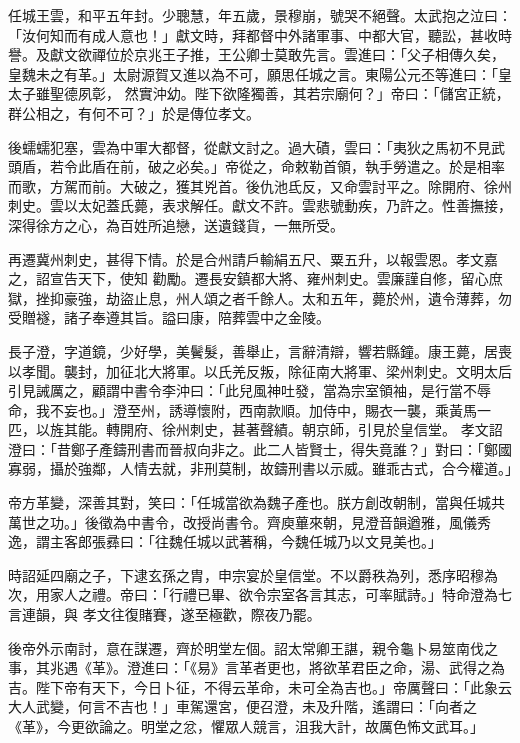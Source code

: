 
\begin{pinyinscope}

 任城王雲，和平五年封。少聰慧，年五歲，景穆崩，號哭不絕聲。太武抱之泣曰：「汝何知而有成人意也！」獻文時，拜都督中外諸軍事、中都大官，聽訟，甚收時譽。及獻文欲禪位於京兆王子推，王公卿士莫敢先言。雲進曰：「父子相傳久矣，皇魏未之有革。」太尉源賀又進以為不可，願思任城之言。東陽公元丕等進曰：「皇太子雖聖德夙彰，
 然實沖幼。陛下欲隆獨善，其若宗廟何？」帝曰：「儲宮正統，群公相之，有何不可？」於是傳位孝文。



 後蠕蠕犯塞，雲為中軍大都督，從獻文討之。過大磧，雲曰：「夷狄之馬初不見武頭盾，若令此盾在前，破之必矣。」帝從之，命敕勒首領，執手勞遣之。於是相率而歌，方駕而前。大破之，獲其兇首。後仇池氐反，又命雲討平之。除開府、徐州刺史。雲以太妃蓋氏薨，表求解任。獻文不許。雲悲號動疾，乃許之。性善撫接，深得徐方之心，為百姓所追戀，送遺錢貨，一無所受。



 再遷冀州刺史，甚得下情。於是合州請戶輸絹五尺、粟五升，以報雲恩。孝文嘉之，詔宣告天下，使知
 勸勵。遷長安鎮都大將、雍州刺史。雲廉謹自修，留心庶獄，挫抑豪強，劫盜止息，州人頌之者千餘人。太和五年，薨於州，遺令薄葬，勿受贈襚，諸子奉遵其旨。謚曰康，陪葬雲中之金陵。



 長子澄，字道鏡，少好學，美鬢髮，善舉止，言辭清辯，響若縣鐘。康王薨，居喪以孝聞。襲封，加征北大將軍。以氏羌反叛，除征南大將軍、梁州刺史。文明太后引見誡厲之，顧謂中書令李沖曰：「此兒風神吐發，當為宗室領袖，是行當不辱命，我不妄也。」澄至州，誘導懷附，西南款順。加侍中，賜衣一襲，乘黃馬一匹，以旌其能。轉開府、徐州刺史，甚著聲績。朝京師，引見於皇信堂。
 孝文詔澄曰：「昔鄭子產鑄刑書而晉叔向非之。此二人皆賢士，得失竟誰？」對曰：「鄭國寡弱，攝於強鄰，人情去就，非刑莫制，故鑄刑書以示威。雖乖古式，合今權道。」



 帝方革變，深善其對，笑曰：「任城當欲為魏子產也。朕方創改朝制，當與任城共萬世之功。」後徵為中書令，改授尚書令。齊庾蓽來朝，見澄音韻遒雅，風儀秀逸，謂主客郎張彞曰：「往魏任城以武著稱，今魏任城乃以文見美也。」



 時詔延四廟之子，下逮玄孫之胄，申宗宴於皇信堂。不以爵秩為列，悉序昭穆為次，用家人之禮。帝曰：「行禮已畢、欲令宗室各言其志，可率賦詩。」特命澄為七言連韻，與
 孝文往復賭賽，遂至極歡，際夜乃罷。



 後帝外示南討，意在謀遷，齊於明堂左個。詔太常卿王諶，親令龜卜易筮南伐之事，其兆遇《革》。澄進曰：「《易》言革者更也，將欲革君臣之命，湯、武得之為吉。陛下帝有天下，今日卜征，不得云革命，未可全為吉也。」帝厲聲曰：「此象云大人武變，何言不吉也！」車駕還宮，便召澄，未及升階，遙謂曰：「向者之《革》，今更欲論之。明堂之忿，懼眾人競言，沮我大計，故厲色怖文武耳。」




\end{pinyinscope}
